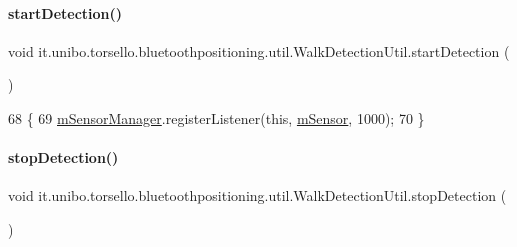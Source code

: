 \paragraph{\texorpdfstring{start\+Detection()}{startDetection()}}
{\footnotesize\ttfamily void it.\+unibo.\+torsello.\+bluetoothpositioning.\+util.\+Walk\+Detection\+Util.\+start\+Detection (\begin{DoxyParamCaption}{ }\end{DoxyParamCaption})}


\begin{DoxyCode}
68                                  \{
69         \hyperlink{classit_1_1unibo_1_1torsello_1_1bluetoothpositioning_1_1util_1_1WalkDetectionUtil_afa8539715b8ef707d07c16e1ff27050d_afa8539715b8ef707d07c16e1ff27050d}{mSensorManager}.registerListener(\textcolor{keyword}{this}, \hyperlink{classit_1_1unibo_1_1torsello_1_1bluetoothpositioning_1_1util_1_1WalkDetectionUtil_a986c50a12f56513e975fc52cadc819af_a986c50a12f56513e975fc52cadc819af}{mSensor}, 1000);
70     \}
\end{DoxyCode}
\hypertarget{classit_1_1unibo_1_1torsello_1_1bluetoothpositioning_1_1util_1_1WalkDetectionUtil_a8390695e6d52a2a523b0bd74e919e616_a8390695e6d52a2a523b0bd74e919e616}{}\label{classit_1_1unibo_1_1torsello_1_1bluetoothpositioning_1_1util_1_1WalkDetectionUtil_a8390695e6d52a2a523b0bd74e919e616_a8390695e6d52a2a523b0bd74e919e616} 
\paragraph{\texorpdfstring{stop\+Detection()}{stopDetection()}}
{\footnotesize\ttfamily void it.\+unibo.\+torsello.\+bluetoothpositioning.\+util.\+Walk\+Detection\+Util.\+stop\+Detection (\begin{DoxyParamCaption}{ }\end{DoxyParamCaption})}


